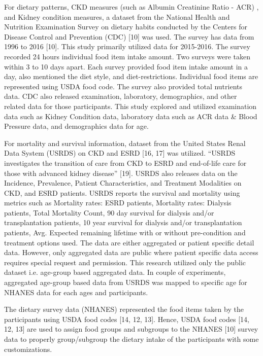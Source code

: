 \medskip 

\noindent For dietary patterns, CKD measures (such as Albumin Creatinine Ratio - ACR) , and Kidney condition measures, a dataset from the National Health and Nutrition Examination Survey on dietary habits conducted by the Centers for Disease Control and Prevention (CDC) [10] was used. The survey has data from 1996 to 2016 [10]. This study primarily utilized data for 2015-2016. The survey recorded 24 hours individual food item intake amount. Two surveys were taken within 3 to 10 days apart. Each survey provided food item intake amount in a day, also mentioned the diet style, and diet-restrictions. Individual food items are represented using USDA food code. The survey also provided total nutrients data. CDC also released examination, laboratory, demographics, and other related data for those participants. This study explored and utilized examination data such as Kidney Condition data, laboratory data such as ACR data \& Blood Pressure data, and demographics data for age.

\medskip 
\noindent For mortality and survival information, dataset from the United States Renal Data System (USRDS) on CKD and ESRD [16, 17] was utilized. “USRDS investigates the transition of care from CKD to ESRD and end-of-life care for those with advanced kidney disease” [19]. USRDS also releases data on the Incidence, Prevalence, Patient Characteristics, and Treatment Modalities on CKD, and ESRD patients. USRDS reports the survival and mortality using metrics such as Mortality rates: ESRD patients,  Mortality rates: Dialysis patients, Total Mortality Count, 90 day survival for dialysis and/or transplantation patients, 10 year survival for dialysis and/or transplantation patients, Avg. Expected remaining lifetime with or without pre-condition and treatment options used. The data are either aggregated or patient specific detail data. However, only aggregated data are public where patient specific data access requires special request and permission. This research utilized only the public dataset i.e. age-group based aggregated data. In couple of experiments, aggregated age-group based data from USRDS was mapped to specific age for NHANES data for each ages and participants.

\medskip
\noindent The dietary survey data (NHANES) represented the food items taken by the participants using USDA food codes [14, 12, 13]. Hence, USDA food codes [14, 12, 13] are used to assign food groups and subgroups to the NHANES [10] survey data to properly group/subgroup the dietary intake of the participants with some customizations.

